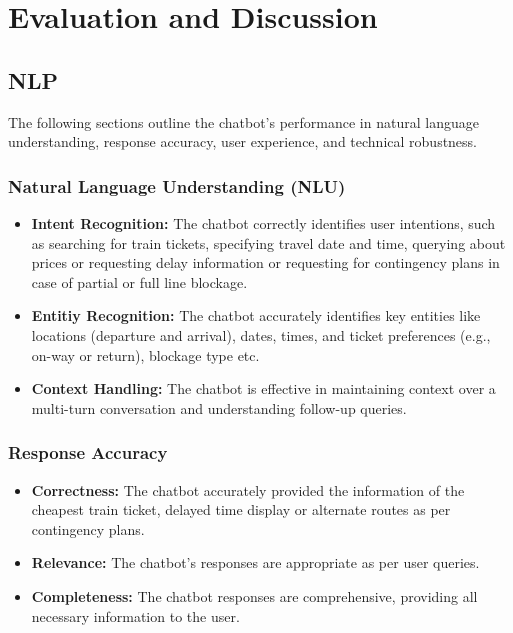 \section{Evaluation and Discussion}


\subsection{NLP}
The following sections outline the chatbot's performance in natural language understanding, response accuracy, user experience, and technical robustness. 
\subsubsection{Natural Language Understanding (NLU)}
\begin{itemize}
    \item \textbf{Intent Recognition:} The chatbot correctly identifies user intentions, such as searching for train tickets, specifying travel date and time, querying about prices or requesting delay information or requesting for contingency plans in case of partial or full line blockage.
    \item \textbf{Entitiy Recognition:} The chatbot accurately identifies key entities like locations (departure and arrival), dates, times, and ticket preferences (e.g., on-way or return), blockage type etc.
    \item \textbf{Context Handling:} The chatbot is effective in maintaining context over a multi-turn conversation and understanding follow-up queries.
\end{itemize} 

\subsubsection{Response Accuracy}
\begin{itemize}
    \item \textbf{Correctness:} The chatbot accurately provided the information of the cheapest train ticket, delayed time display or alternate routes as per contingency plans.
    \item \textbf{Relevance:} The chatbot's responses are appropriate as per user queries.
    \item \textbf{Completeness:} The chatbot responses are comprehensive, providing all necessary information to the user.
\end{itemize} 

